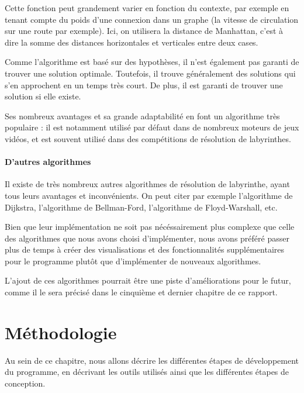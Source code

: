 \documentclass[12pt]{scrreprt} %
\begin{document}
Cette fonction peut grandement varier en fonction du contexte, par exemple en tenant compte du poids d'une connexion dans un graphe (la vitesse de circulation sur une route par exemple). Ici, on utilisera la distance de Manhattan, c'est à dire la somme des distances horizontales et verticales entre deux cases.

Comme l'algorithme est basé sur des hypothèses, il n'est également pas garanti de trouver une solution optimale. Toutefois, il trouve généralement des solutions qui s'en approchent en un temps très court. De plus, il est garanti de trouver une solution si elle existe.

Ses nombreux avantages et sa grande adaptabilité en font un algorithme très populaire : il est notamment utilisé par défaut dans de nombreux moteurs de jeux vidéos, et est souvent utilisé dans des compétitions de résolution de labyrinthes.

\subsubsection{D'autres algorithmes}

Il existe de très nombreux autres algorithmes de résolution de labyrinthe, ayant tous leurs avantages et inconvénients. On peut citer par exemple l'algorithme de Dijkstra, l'algorithme de Bellman-Ford, l'algorithme de Floyd-Warshall, etc.

Bien que leur implémentation ne soit pas nécéssairement plus complexe que celle des algorithmes que nous avons choisi d'implémenter, nous avons préféré passer plus de temps à créer des visualisations et des fonctionnalités supplémentaires pour le programme plutôt que d'implémenter de nouveaux algorithmes.

L'ajout de ces algorithmes pourrait être une piste d'améliorations pour le futur, comme il le sera précisé dans le cinquième et dernier chapitre de ce rapport.

\chapter{Méthodologie}


Au sein de ce chapitre, nous allons décrire les différentes étapes de développement du programme, en décrivant les outils utilisés ainsi que les différentes étapes de conception.
\end{document}
